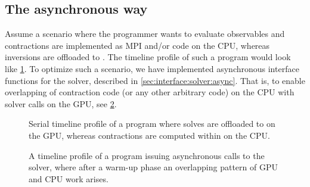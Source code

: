 \subsection{The asynchronous way}
\label{sec:develop:async:way}


Assume a scenario where the programmer wants to evaluate observables and contractions are implemented as MPI and/or \openmp code on the CPU, whereas inversions are offloaded to \quda.
The timeline profile of such a program would look like \cref{fig:develop:serial}.
To optimize such a scenario, we have implemented asynchronous interface functions for the solver, described in \cref{sec:interface:solver:async}.
That is, to enable overlapping of contraction code (or any other arbitrary code) on the CPU with solver calls on the GPU, see \cref{fig:develop:pipelining}.
\begin{figure}
  
  \caption{Serial timeline profile of a program where solves are offloaded to \quda on the GPU, whereas contractions are computed within \openqxd on the CPU.}
  \label{fig:develop:serial}
\end{figure}
\begin{figure}
  
  \caption{A timeline profile of a program issuing asynchronous calls to the solver, where after a warm-up phase an overlapping pattern of GPU and CPU work arises.}
  \label{fig:develop:pipelining}
\end{figure}

